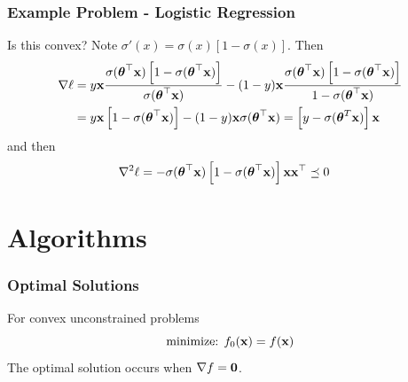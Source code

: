 \documentclass{beamer}
\begin{document}
\begin{frame}
    \frametitle{Example Problem - Logistic Regression}
    Is this convex? Note $\sigma'(x) = \sigma(x)\left[1 - \sigma(x)\right]$.
    Then
    \begin{align*}
        \nabla \ell &= y{\bf x}\frac{\sigma(\hbox{\boldmath$\theta$}^\top{\bf x})\left[ 1-\sigma(\hbox{\boldmath$\theta$}^\top{\bf x}) \right]}{\sigma(\hbox{\boldmath$\theta$}^\top{\bf x})} - (1-y){\bf x}\frac{\sigma(\hbox{\boldmath$\theta$}^\top{\bf x})\left[ 1-\sigma(\hbox{\boldmath$\theta$}^\top{\bf x}) \right]}{1-\sigma(\hbox{\boldmath$\theta$}^\top{\bf x})}\\
        &= y{\bf x}\left[1 - \sigma(\hbox{\boldmath$\theta$}^\top{\bf x})\right] - (1-y){\bf x}\sigma(\hbox{\boldmath$\theta$}^\top{\bf x}) = \left[y-\sigma(\hbox{\boldmath$\theta$}^T{\bf x})\right]{\bf x}
    \end{align*}
    and then
    \begin{align*}
        \nabla^2 \ell &= -\sigma(\hbox{\boldmath$\theta$}^\top{\bf x})\left[1 - \sigma(\hbox{\boldmath$\theta$}^\top{\bf x})\right]{\bf x}{\bf x}^\top \preceq 0
    \end{align*}
\end{frame}

\section{Algorithms}
\begin{frame}
    \frametitle{Optimal Solutions}
    For convex unconstrained problems
    \[
        \text{minimize: } f_0({\bf x}) = f({\bf x})
    \]
    The optimal solution occurs when $\nabla f = {\bf 0}$.
\end{frame}
\end{document}
